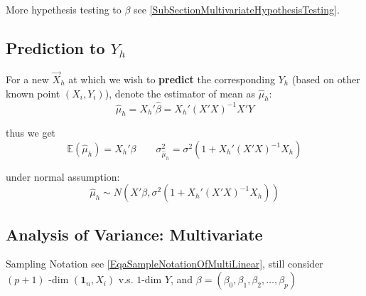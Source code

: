 \noindent More hypethesis testing to $ \beta  $ see \autoref{SubSectionMultivariateHypothesisTesting}.



\subsection{Prediction to $ Y_h $}
    For a new $ \vec{X}_h $ at which we wish to \textbf{predict }the corresponding $ Y_h $ (based on other known point $ (X_i,Y_i) $), denote the estimator of mean as $ \hat{\mu}_h $:
    \begin{equation}
        \hat{\mu }_h=X_h'\hat{\beta }=X_h'(X'X)^{-1}X'Y
    \end{equation}
    
    thus we get 
    \begin{equation}
        \mathbb{E}(\hat{\mu }_h)= X_h'\beta  \qquad \sigma ^2_{\hat{\mu}_h}=\sigma ^2(1+X_h'(X'X)^{-1}X_h)
    \end{equation}

    under normal assumption:
    \begin{equation}
        \hat{\mu}_h\sim N(X'\beta,\sigma ^2(1+X_h'(X'X)^{-1}X_h))
    \end{equation}

    
    
    
    
    

    

\subsection{Analysis of Variance: Multivariate}\label{SubSubSectionLinearRegressionMultiANOVA}
    Sampling Notation see \autoref{EqaSampleNotationOfMultiLinear}, still consider $ (p+1) $ -dim $ (\mathbf{1}_n,X_i) $ v.s. $ 1 $-dim $ Y $, and $ \beta=(\beta _0,\beta _1,\beta _2,\ldots,\beta _p) $

